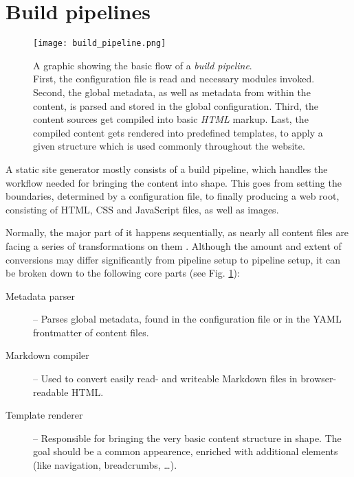 \section{Build pipelines}
\label{sec:buildpipelines}

\begin{figure} %
    \centering
    \texttt{[image: build\_pipeline.png]}
    \caption{A graphic showing the basic flow of a \emph{build pipeline}.\\
    First, the configuration file is read and necessary modules invoked. Second, the global metadata, as well as metadata from within the content, is parsed and stored in the global configuration. Third, the content sources get compiled into basic \emph{HTML} markup. Last, the compiled content gets rendered into predefined templates, to apply a given structure which is used commonly throughout the website.}
    \label{fig:build-pipeline}
\end{figure}
%

A static site generator mostly consists of a build pipeline, which handles the workflow needed for bringing the content into shape. This goes from setting the boundaries, determined by a configuration file, to finally producing a web root, consisting of HTML, CSS and JavaScript files, as well as images.

Normally, the major part of it happens sequentially, as nearly all content files are facing a series of transformations on them \cite{Metalsmith2015technicaldocumentation}. Although the amount and extent of conversions may differ significantly from pipeline setup to pipeline setup, it can be broken down to the following core parts (see Fig. \ref{fig:build-pipeline}):

\begin{description}
  \item[Metadata parser] -- Parses global metadata, found in the configuration file or in the YAML frontmatter of content files.
  \item[Markdown compiler] -- Used to convert easily read- and writeable Markdown files in browser-readable HTML.
  \item[Template renderer] -- Responsible for bringing the very basic content structure in shape. The goal should be a common appearence, enriched with additional elements (like navigation, breadcrumbs, \ldots).
\end{description}

